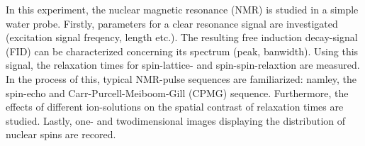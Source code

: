 \documentclass[../main.tex]{subfiles}
\begin{document}

In this experiment, the nuclear magnetic resonance (NMR) is studied in a simple water probe. Firstly, parameters for a clear resonance signal are investigated (excitation signal freqency, length etc.). The resulting free induction decay-signal (FID) can be characterized concerning its spectrum (peak, banwidth). Using this signal, the relaxation times for spin-lattice- and spin-spin-relaxtion are measured. In the process of this, typical NMR-pulse sequences are familiarized: namley, the spin-echo and Carr-Purcell-Meiboom-Gill (CPMG) sequence. Furthermore, the effects of different ion-solutions on the spatial contrast of relaxation times are studied. Lastly, one- and twodimensional images displaying the distribution of nuclear spins are recored.
\end{document}
